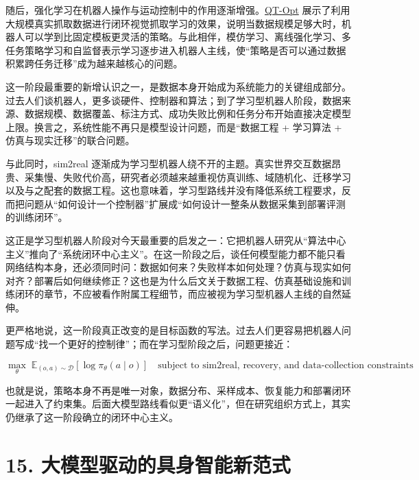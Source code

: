 随后，强化学习在机器人操作与运动控制中的作用逐渐增强。\href{https://arxiv.org/abs/1806.10293}{QT-Opt} 展示了利用大规模真实抓取数据进行闭环视觉抓取学习的效果，说明当数据规模足够大时，机器人可以学到比固定模板更灵活的策略。与此相伴，模仿学习、离线强化学习、多任务策略学习和自监督表示学习逐步进入机器人主线，使“策略是否可以通过数据积累跨任务迁移”成为越来越核心的问题。

这一阶段最重要的新增认识之一，是数据本身开始成为系统能力的关键组成部分。过去人们谈机器人，更多谈硬件、控制器和算法；到了学习型机器人阶段，数据来源、数据规模、数据覆盖、标注方式、成功失败比例和任务分布开始直接决定模型上限。换言之，系统性能不再只是模型设计问题，而是“数据工程 + 学习算法 + 仿真与现实迁移”的联合问题。

与此同时，sim2real 逐渐成为学习型机器人绕不开的主题。真实世界交互数据昂贵、采集慢、失败代价高，研究者必须越来越重视仿真训练、域随机化、迁移学习以及与之配套的数据工程。这也意味着，学习型路线并没有降低系统工程要求，反而把问题从“如何设计一个控制器”扩展成“如何设计一整条从数据采集到部署评测的训练闭环”。

这正是学习型机器人阶段对今天最重要的启发之一：它把机器人研究从“算法中心主义”推向了“系统闭环中心主义”。在这一阶段之后，谈任何模型能力都不能只看网络结构本身，还必须同时问：数据如何来？失败样本如何处理？仿真与现实如何对齐？部署后如何继续修正？这也是为什么后文关于数据工程、仿真基础设施和训练闭环的章节，不应被看作附属工程细节，而应被视为学习型机器人主线的自然延伸。

更严格地说，这一阶段真正改变的是目标函数的写法。过去人们更容易把机器人问题写成“找一个更好的控制律”；而在学习型阶段之后，问题更接近：

\begingroup
\scriptsize
\begin{equation*}
\max_{\theta}\; \mathbb{E}_{(o,a)\sim \mathcal{D}}[\log \pi_\theta(a\mid o)]
\quad \text{subject to sim2real, recovery, and data-collection constraints}
\end{equation*}
\endgroup

也就是说，策略本身不再是唯一对象，数据分布、采样成本、恢复能力和部署闭环一起进入了约束集。后面大模型路线看似更“语义化”，但在研究组织方式上，其实仍继承了这一阶段确立的闭环中心主义。

\chapter*{15. 大模型驱动的具身智能新范式}

